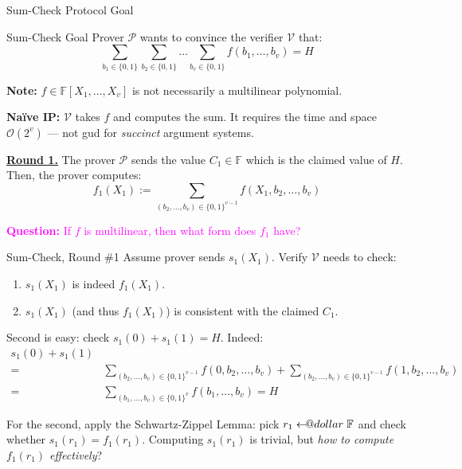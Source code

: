 \documentclass{zkdl-presentation-template}
\makeatletter
\newcommand\leftarrowS{\leftarrow\joinrel\smalldollar}
\newcommand{\smalldollar}{\mathrel{\mathpalette\small@dollar\relax}}
\newcommand{\small@dollar}[2]{%
  \vcenter{\hbox{%
    $#1\textnormal{\fontsize{0.7\dimexpr\f@size pt}{0}\selectfont\$}$%
  }}%
}
\makeatother
\begin{document}
    \begin{frame}{Sum-Check Protocol Goal}
        \begin{alertblock}{Sum-Check Goal}
            Prover $\mathcal{P}$ wants to convince the verifier $\mathcal{V}$ that:
            \begin{equation*}
                \sum_{b_1 \in \{0,1\}}\sum_{b_2 \in \{0,1\}}\dots \sum_{b_v \in \{0,1\}} f(b_1,\dots,b_v) = H
            \end{equation*}

            \textbf{Note:} $f \in \mathbb{F}[X_1,\dots,X_v]$ is not necessarily
            a multilinear polynomial.
        \end{alertblock}

        \textbf{Naïve IP:} $\mathcal{V}$ takes $f$ and computes the sum. It
        requires the time and space $\mathcal{O}(2^v)$ --- not gud for
        \textit{succinct} argument systems.

        \underline{\textbf{Round 1.}} The prover $\mathcal{P}$ sends the value
        $C_1 \in \mathbb{F}$ which is the claimed value of $H$. Then, the prover computes:
        \begin{equation*}
            f_1(X_1) := \sum_{(b_2,\dots,b_v) \in \{0,1\}^{v-1}}f(X_1,b_2,\dots,b_v)
        \end{equation*}
        
        \vspace{-12.5px}

        \textcolor{magenta}{\textbf{Question:} If $f$ is multilinear, then what
        form does $f_1$ have?}
    \end{frame}

    \begin{frame}{Sum-Check, Round \#1}
        Assume prover sends $s_1(X_1)$. Verify $\mathcal{V}$ needs to check:
        \begin{enumerate}
            \item $s_1(X_1)$ is indeed $f_1(X_1)$.
            \item $s_1(X_1)$ (and thus $f_1(X_1)$) is consistent with the
            claimed $C_1$.
        \end{enumerate}

        Second is easy: check $s_1(0) + s_1(1) = H$. Indeed:
        \begin{align*}
            s_1(0) + s_1(1) \\
            =&\sum_{(b_2,\dots,b_v) \in \{0,1\}^{v-1}}f(0,b_2,\dots,b_v) + \sum_{(b_2,\dots,b_v) \in \{0,1\}^{v-1}}f(1,b_2,\dots,b_v) \\
            =&\sum_{(b_1,\dots,b_v) \in \{0,1\}^v} f(b_1,\dots,b_v) = H
        \end{align*}

        For the second, apply the Schwartz-Zippel Lemma: pick $r_1 \leftarrowS
        \mathbb{F}$ and check whether $s_1(r_1) = f_1(r_1)$. Computing
        $s_1(r_1)$ is trivial, but \textit{how to compute $f_1(r_1)$
        effectively}?
    \end{frame}
\end{document}

